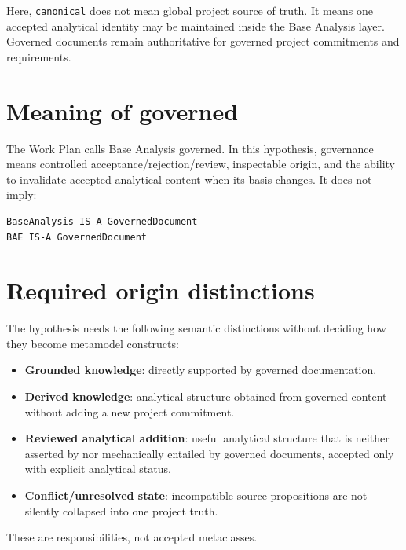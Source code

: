 \documentclass[10pt,a4paper]{article}
\begin{document}
Here, \texttt{canonical} does not mean global project source of truth. It means one accepted analytical identity may be maintained inside the Base Analysis layer. Governed documents remain authoritative for governed project commitments and requirements.

\section{Meaning of governed}
The Work Plan calls Base Analysis governed. In this hypothesis, governance means controlled acceptance/rejection/review, inspectable origin, and the ability to invalidate accepted analytical content when its basis changes. It does not imply:
\begin{lstlisting}
BaseAnalysis IS-A GovernedDocument
BAE IS-A GovernedDocument
\end{lstlisting}

\section{Required origin distinctions}
The hypothesis needs the following semantic distinctions without deciding how they become metamodel constructs:
\begin{itemize}
\item \textbf{Grounded knowledge}: directly supported by governed documentation.
\item \textbf{Derived knowledge}: analytical structure obtained from governed content without adding a new project commitment.
\item \textbf{Reviewed analytical addition}: useful analytical structure that is neither asserted by nor mechanically entailed by governed documents, accepted only with explicit analytical status.
\item \textbf{Conflict/unresolved state}: incompatible source propositions are not silently collapsed into one project truth.
\end{itemize}
These are responsibilities, not accepted metaclasses.
\end{document}
